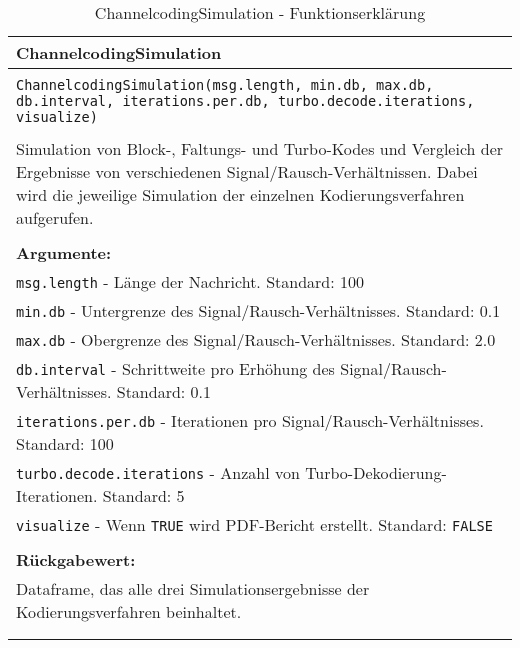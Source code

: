 \begin{longtable}{|p{\textwidth}|}
\hline
\rowcolor{lightblue}ChannelcodingSimulation\\
\hline
\\
\texttt{ChannelcodingSimulation(msg.length, min.db, max.db, db.interval, iterations.per.db, turbo.decode.iterations, visualize)}\\
\\
Simulation von Block-, Faltungs- und Turbo-Kodes und Vergleich der Ergebnisse von verschiedenen Signal/Rausch-Verhältnissen. Dabei wird die jeweilige Simulation der einzelnen Kodierungsverfahren aufgerufen.\\
\\
\textbf{Argumente:}\\
\texttt{msg.length} - Länge der Nachricht. Standard: 100\\
\texttt{min.db} - Untergrenze des Signal/Rausch-Verhältnisses. Standard: 0.1\\
\texttt{max.db} - Obergrenze des Signal/Rausch-Verhältnisses. Standard: 2.0\\
\texttt{db.interval} - Schrittweite pro Erhöhung des Signal/Rausch-Verhältnisses. Standard: 0.1\\
\texttt{iterations.per.db} - Iterationen pro Signal/Rausch-Verhältnisses. Standard: 100\\
\texttt{turbo.decode.iterations} - Anzahl von Turbo-Dekodierung-Iterationen. Standard: 5\\
\texttt{visualize} - Wenn \texttt{TRUE} wird PDF-Bericht erstellt. Standard: \texttt{FALSE}\\
\\
\textbf{Rückgabewert:}\\
Dataframe, das alle drei Simulationsergebnisse der Kodierungsverfahren beinhaltet.\\
\\
\hline
\caption[ChannelcodingSimulation]{ChannelcodingSimulation - Funktionserklärung}
\end{longtable}